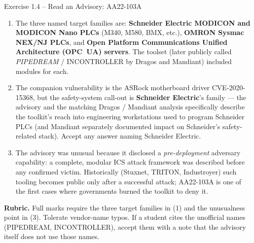 \documentclass[11pt,a4paper]{article}
\begin{document}
\begin{solutionbox}{Exercise 1.4 -- Read an Advisory: AA22-103A}
\begin{enumerate}
  \item The three named target families are: \textbf{Schneider Electric MODICON and MODICON Nano PLCs} (M340, M580, BMX, etc.), \textbf{OMRON Sysmac NEX/NJ PLCs}, and \textbf{Open Platform Communications Unified Architecture (OPC~UA) servers}. The toolset (later publicly called \emph{PIPEDREAM} / INCONTROLLER by Dragos and Mandiant) included modules for each.
  \item The companion vulnerability is the ASRock motherboard driver CVE-2020-15368, but the safety-system call-out is \textbf{Schneider Electric}'s family --- the advisory and the matching Dragos / Mandiant analysis specifically describe the toolkit's reach into engineering workstations used to program Schneider PLCs (and Mandiant separately documented impact on Schneider's safety-related stack). Accept any answer naming Schneider Electric.
  \item The advisory was unusual because it disclosed a \emph{pre-deployment} adversary capability: a complete, modular ICS attack framework was described before any confirmed victim. Historically (Stuxnet, TRITON, Industroyer) such tooling becomes public only after a successful attack; AA22-103A is one of the first cases where governments burned the toolkit to deny it.
\end{enumerate}

\textbf{Rubric.} Full marks require the three target families in (1) and the unusualness point in (3). Tolerate vendor-name typos. If a student cites the unofficial names (PIPEDREAM, INCONTROLLER), accept them with a note that the advisory itself does not use those names.
\end{solutionbox}
\end{document}
